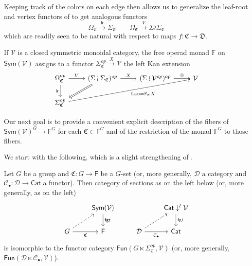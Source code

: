 \documentclass[a4paper,10pt
,draft
]{article}%
\renewcommand{\1}{\eta}%
\begin{document}
Keeping track of the colors on each edge then allows us to generalize the leaf-root and vertex functors of 
\cite{BP_geo} to get analogous functors
\[
\Omega_{\mathfrak{C}} \xrightarrow{\mathsf{lr}} \Sigma_{\mathfrak{C}}
\qquad
\Omega_{\mathfrak{C}} \xrightarrow{V} \Sigma \wr \Sigma_{\mathfrak{C}}
\]
which are readily seen to be natural with respect to maps 
$f \colon \mathfrak{C} \to \mathfrak{D}$.

If $\mathcal{V}$ is a closed symmetric monoidal category, the free operad monad $\mathbb{F}$ on $\mathsf{Sym}(\mathcal{V})$ 
assigns to a functor
$\Sigma_{\mathfrak{C}}^{op} \xrightarrow{X} \mathcal{V}$
the left Kan extension
\begin{equation}
\begin{tikzcd}
	\Omega^{op}_{\mathfrak{C}}
	\arrow[d, "\mathsf{lr}"']
	\arrow[r, "V"]
&
	(\Sigma \wr \Sigma_{\mathfrak{C}})^{op} \arrow[r, "X"]
	\arrow[dl, Rightarrow]
&
	(\Sigma \wr \V^{op})^{op} \arrow[r, "\otimes"]
&
	\V
\\
	\Sigma^{op}_{\mathfrak{C}} \arrow[urrr, "\Lan = \mathbb F_{\mathfrak{C}} X"']
\end{tikzcd}
\end{equation}


Our next goal is to provide a convenient explicit description of the fibers of $\mathsf{Sym}(\mathcal{V})^G \to \mathsf{F}^G$
for each $\mathfrak{C} \in \mathsf{F}^G$
and of the restriction of the monad $\mathbb{F}^G$ to those fibers.

We start with the following, which is a slight strengthening of
\cite[Lemma A.6]{BP_geo}.

\begin{lemma}
Let $G$ be a group and $\mathfrak{C} \colon G \to \mathsf{F}$ be a $G$-set (or, more generally, $\mathcal{D}$ a category and 
$\mathcal{C}_{\bullet}\colon \mathcal{D} \to \mathsf{Cat}$ a functor). Then category of sections as on the left below (or, more generally, as on the left)
\begin{equation}
	\begin{tikzcd}
		&
		\mathsf{Sym}(\mathcal{V}) \arrow{d}{\mathsf{fgt}}
&
		&
		\mathsf{Cat}\downarrow^l \mathcal{V} \arrow{d}{\mathsf{fgt}}
\\
		G \arrow{r}[swap]{\mathfrak{C}} \arrow[dashed]{ru} &
		\mathsf{F}
&
		\mathcal{D} \arrow{r}[swap]{\mathcal{C}_{\bullet}} \arrow[dashed]{ru} &
		\mathsf{Cat}
	\end{tikzcd}
\end{equation}
is isomorphic to the functor category
$\mathsf{Fun}(G\ltimes \Sigma_{\mathfrak{C}}^{op},\mathcal{V})$
(or, more generally, $\mathsf{Fun}(\mathcal{D} \ltimes \mathcal{C}_{\bullet},\mathcal{V})$).
\end{lemma}
\end{document}

